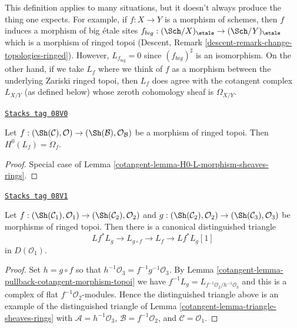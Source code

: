 This definition applies to many situations, but it doesn't always produce
the thing one expects. For example, if $f : X \to Y$ is a morphism of
schemes, then $f$ induces a morphism of big \'etale sites
$f_{big} : (\Sch/X)_\etale \to (\Sch/Y)_\etale$
which is a morphism of ringed topoi (Descent, Remark
\ref{descent-remark-change-topologies-ringed}).
However, $L_{f_{big}} = 0$ since $(f_{big})^\sharp$ is an isomorphism.
On the other hand, if we take $L_f$ where we think of $f$ as a morphism
between the underlying Zariski ringed topoi, then $L_f$ does agree with
the cotangent complex $L_{X/Y}$ (as defined below)
whose zeroth cohomology sheaf is $\Omega_{X/Y}$.

\begin{lemma}
\label{cotangent-lemma-H0-L-morphism-ringed-topoi}
\href{https://stacks.math.columbia.edu/tag/08V0}{\texttt{Stacks tag 08V0}}

Let $f : (\Sh(\mathcal{C}), \mathcal{O}) \to
(\Sh(\mathcal{B}), \mathcal{O}_\mathcal{B})$ be a morphism of
ringed topoi. Then $H^0(L_f) = \Omega_f$.
\end{lemma}

\begin{proof}

Special case of Lemma \ref{cotangent-lemma-H0-L-morphism-sheaves-rings}.
\end{proof}

\begin{lemma}
\label{cotangent-lemma-triangle-ringed-topoi}
\href{https://stacks.math.columbia.edu/tag/08V1}{\texttt{Stacks tag 08V1}}

Let $f : (\Sh(\mathcal{C}_1), \mathcal{O}_1) \to
(\Sh(\mathcal{C}_2), \mathcal{O}_2)$ and
$g : (\Sh(\mathcal{C}_2), \mathcal{O}_2) \to
(\Sh(\mathcal{C}_3), \mathcal{O}_3)$ be morphisms of ringed topoi.
Then there is a canonical distinguished triangle
$$
Lf^* L_g \to L_{g \circ f} \to L_f \to Lf^*L_g[1]
$$
in $D(\mathcal{O}_1)$.
\end{lemma}

\begin{proof}

Set $h = g \circ f$ so that $h^{-1}\mathcal{O}_3 = f^{-1}g^{-1}\mathcal{O}_3$.
By Lemma \ref{cotangent-lemma-pullback-cotangent-morphism-topoi} we have
$f^{-1}L_g = L_{f^{-1}\mathcal{O}_2/h^{-1}\mathcal{O}_3}$
and this is a complex of flat $f^{-1}\mathcal{O}_2$-modules.
Hence the distinguished triangle above is an example of the
distinguished triangle of
Lemma \ref{cotangent-lemma-triangle-sheaves-rings}
with $\mathcal{A} = h^{-1}\mathcal{O}_3$, $\mathcal{B} = f^{-1}\mathcal{O}_2$,
and $\mathcal{C} = \mathcal{O}_1$.
\end{proof}

